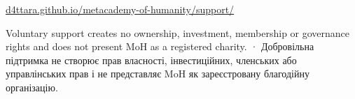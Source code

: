 \documentclass[10pt,a4paper]{article}
\begin{document}
\vfill
{\fontsize{8}{11}\selectfont\color{MoHMuted}\href{https://d4ttara.github.io/metacademy-of-humanity/support/}{d4ttara.github.io/metacademy-of-humanity/support/}\par}
\vspace{3mm}
{\fontsize{7.5}{10}\selectfont\color{MoHMuted}Voluntary support creates no ownership, investment, membership or governance rights and does not present MoH as a registered charity. · Добровільна підтримка не створює прав власності, інвестиційних, членських або управлінських прав і не представляє MoH як зареєстровану благодійну організацію.\par}
\end{document}
